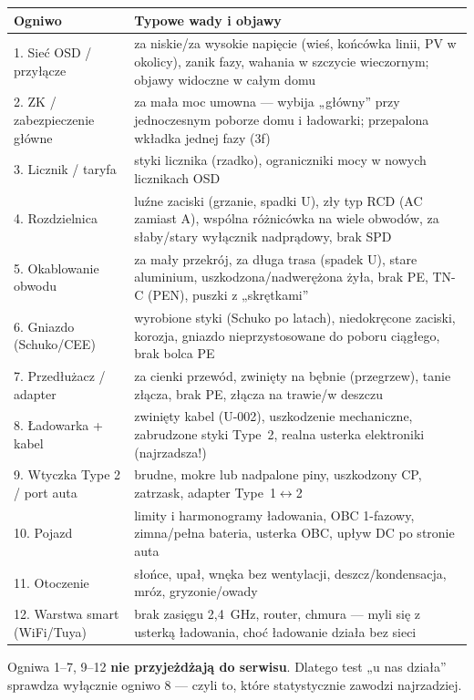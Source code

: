 \documentclass[11pt]{article}
\newcommand{\key}[1]{\textbf{\color{navy}#1}}
\begin{document}
\begin{tabularx}{\textwidth}{@{}p{4.2cm}Y@{}}
\toprule
\textbf{\sffamily Ogniwo} & \textbf{\sffamily Typowe wady i objawy}\\
. Sieć OSD / przyłącze & za niskie/za wysokie napięcie (wieś, końcówka linii, PV w okolicy), zanik fazy, wahania w szczycie wieczornym; objawy widoczne w całym domu\\
2. ZK / zabezpieczenie główne & za mała moc umowna — wybija „główny'' przy jednoczesnym poborze domu i ładowarki; przepalona wkładka jednej fazy (3f)\\
3. Licznik / taryfa & styki licznika (rzadko), ograniczniki mocy w nowych licznikach OSD\\
4. Rozdzielnica & luźne zaciski (grzanie, spadki U), zły typ RCD (AC zamiast A), wspólna różnicówka na wiele obwodów, za słaby/stary wyłącznik nadprądowy, brak SPD\\
5. Okablowanie obwodu & za mały przekrój, za długa trasa (spadek U), stare aluminium, uszkodzona/nadwerężona żyła, brak PE, TN-C (PEN), puszki z „skrętkami''\\
6. Gniazdo (Schuko/CEE) & wyrobione styki (Schuko po latach), niedokręcone zaciski, korozja, gniazdo nieprzystosowane do poboru ciągłego, brak bolca PE\\
7. Przedłużacz / adapter & za cienki przewód, zwinięty na bębnie (przegrzew), tanie złącza, brak PE, złącza na trawie/w deszczu\\
8. Ładowarka + kabel & zwinięty kabel (U-002), uszkodzenie mechaniczne, zabrudzone styki Type~2, realna usterka elektroniki (najrzadsza!)\\
9. Wtyczka Type 2 / port auta & brudne, mokre lub nadpalone piny, uszkodzony CP, zatrzask, adapter Type~1$\leftrightarrow$2\\
10. Pojazd & limity i harmonogramy ładowania, OBC 1-fazowy, zimna/pełna bateria, usterka OBC, upływ DC po stronie auta\\
11. Otoczenie & słońce, upał, wnęka bez wentylacji, deszcz/kondensacja, mróz, gryzonie/owady\\
12. Warstwa smart (WiFi/Tuya) & brak zasięgu 2,4~GHz, router, chmura — myli się z usterką ładowania, choć ładowanie działa bez sieci\\
\bottomrule
\end{tabularx}

Ogniwa 1--7, 9--12 \key{nie przyjeżdżają do serwisu}. Dlatego test „u nas działa'' sprawdza wyłącznie ogniwo 8 — czyli to, które statystycznie zawodzi najrzadziej.
\end{document}

